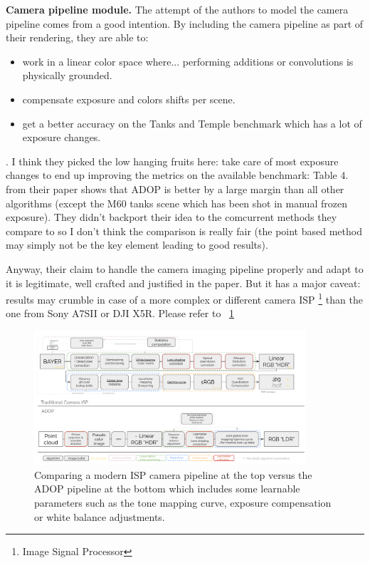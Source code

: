 \noindent \textbf{Camera pipeline module.}
The attempt of the authors to model the camera pipeline comes from a good intention. By including the camera pipeline as part of their rendering, they are able to: 
\begin{itemize}
    \item work in a linear color space where... performing additions or convolutions is physically grounded.
    \item compensate exposure and colors shifts per scene.
    \item get a better accuracy on the Tanks and Temple benchmark which has a lot of exposure changes.
\end{itemize}.
I think they picked the low hanging fruits here: take care of most exposure changes to end up improving the metrics on the available benchmark: Table 4. from their paper shows that ADOP is better by a large margin than all other algorithms (except the M60 tanks scene which has been shot in manual frozen exposure). 
They didn't backport their idea to the comcurrent methods they compare to so I don't think the comparison is really fair (the point based method may simply not be the key element leading to good results).

Anyway, their claim to handle the camera imaging pipeline properly and adapt to it is legitimate, well crafted and justified in the paper. But it has a major caveat: results may crumble in case of a more complex or different camera ISP \footnote{Image Signal Processor} than the one from Sony A7SII or DJI X5R.
Please refer to ~\cref*{fig:ISP}

\begin{figure}[h]
    \centering
    \includegraphics[width=0.9\textwidth]{figures/isp_pipeline_VS_ADOP.png}
    \caption{Comparing a modern ISP camera pipeline at the top versus the ADOP pipeline at the bottom which includes some learnable parameters such as the tone mapping curve, exposure compensation or white balance adjustments.}
    \label{fig:ISP}
\end{figure}

